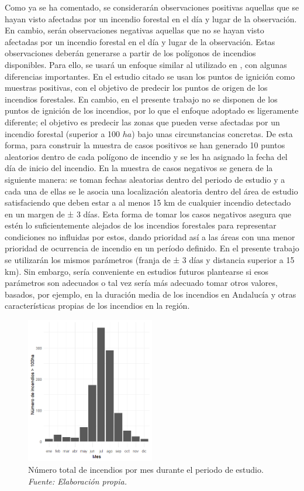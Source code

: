 \documentclass[12pt,a4paper,]{book}
\numberwithin{dummy}{section}
\theoremstyle{ocrenumbox}
\theoremstyle{blacknumex}
\theoremstyle{blacknumbox}
\theoremstyle{ocrenum}
\theoremstyle{ocrenum}
\begin{document}
Como ya se ha comentado, se considerarán observaciones positivas
aquellas que se hayan visto afectadas por un incendio forestal en el día
y lugar de la observación. En cambio, serán observaciones negativas
aquellas que no se hayan visto afectadas por un incendio forestal en el
día y lugar de la observación. Estas observaciones deberán generarse a
partir de los polígonos de incendios disponibles. Para ello, se usará un
enfoque similar al utilizado en \citep{stojanova2012estimating}, con
algunas diferencias importantes. En el estudio citado se usan los puntos
de ignición como muestras positivas, con el objetivo de predecir los
puntos de origen de los incendios forestales. En cambio, en el presente
trabajo no se disponen de los puntos de ignición de los incendios, por
lo que el enfoque adoptado es ligeramente diferente; el objetivo es
predecir las zonas que pueden verse afectadas por un incendio forestal
(superior a 100 \(ha\)) bajo unas circunstancias concretas. De esta
forma, para construir la muestra de casos positivos se han generado 10
puntos aleatorios dentro de cada polígono de incendio y se les ha
asignado la fecha del día de inicio del incendio. En
\citep{stojanova2012estimating} la muestra de casos negativos se genera
de la siguiente manera: se toman fechas aleatorias dentro del periodo de
estudio y a cada una de ellas se le asocia una localización aleatoria
dentro del área de estudio satisfaciendo que deben estar a al menos 15
km de cualquier incendio detectado en un margen de ± 3 días. Esta forma
de tomar los casos negativos asegura que estén lo suficientemente
alejados de los incendios forestales para representar condiciones no
influidas por estos, dando prioridad así a las áreas con una menor
prioridad de ocurrencia de incendio en un período definido. En el
presente trabajo se utilizarán los mismos parámetros (franja de ± 3 días
y distancia superior a 15 km). Sin embargo, sería conveniente en
estudios futuros plantearse si esos parámetros son adecuados o tal vez
sería más adecuado tomar otros valores, basados, por ejemplo, en la
duración media de los incendios en Andalucía y otras características
propias de los incendios en la región.

\begin{figure}[htb]
\centering
\includegraphics[width=0.5\textwidth]{graficos/incendios_mes.png}
\caption[Número total de incendios por mes durante el periodo de estudio]{Número total de incendios por mes durante el periodo de estudio. \it Fuente: Elaboración propia.}
\label{fig:incendios_mes}
\end{figure}
\end{document}

